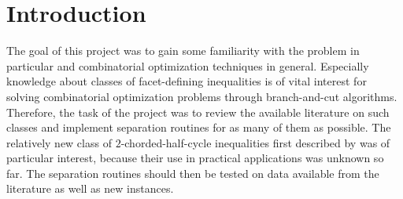 \section{Introduction}
The goal of this project was to gain some familiarity with the \CP problem in particular and combinatorial optimization techniques in general.
Especially knowledge about classes of facet-defining inequalities is of vital interest for solving combinatorial optimization problems through branch-and-cut algorithms.
Therefore, the task of the project was to review the available literature on such classes and implement separation routines for as many of them as possible.
The relatively new class of $2$-chorded-half-cycle inequalities first described by \cite{andresPolyhedralStudyLifted2022} was of particular interest, because their use in practical applications was unknown so far.
The separation routines should then be tested on data available from the literature as well as new instances.

